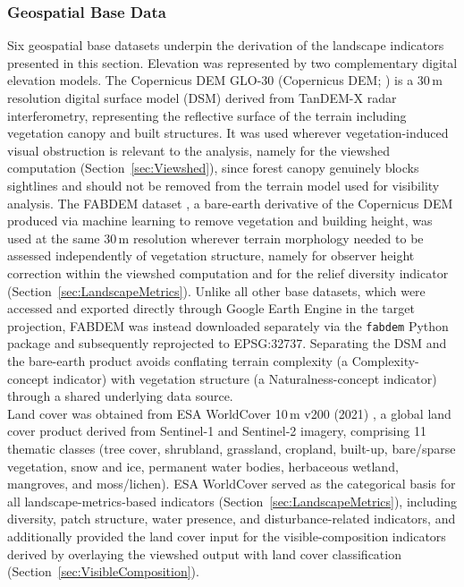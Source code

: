 \documentclass[hidelinks, 11pt]{article}
\begin{document}
\subsubsection{Geospatial Base Data}
Six geospatial base datasets underpin the derivation of the landscape indicators presented in this section. Elevation was represented by two complementary digital elevation models. The Copernicus DEM GLO-30 (Copernicus DEM; \citep{esa_copernicus_2024}) is a 30\,m resolution digital surface model (DSM) derived from TanDEM-X radar interferometry, representing the reflective surface of the terrain including vegetation canopy and built structures. It was used wherever vegetation-induced visual obstruction is relevant to the analysis, namely for the viewshed computation (Section~\ref{sec:Viewshed}), since forest canopy genuinely blocks sightlines and should not be removed from the terrain model used for visibility analysis. The FABDEM dataset \citep{hawker_fabdem_2022}, a bare-earth derivative of the Copernicus DEM produced via machine learning to remove vegetation and building height, was used at the same 30\,m resolution wherever terrain morphology needed to be assessed independently of vegetation structure, namely for observer height correction within the viewshed computation and for the relief diversity indicator (Section~\ref{sec:LandscapeMetrics}). Unlike all other base datasets, which were accessed and exported directly through Google Earth Engine \citep{gorelick_google_2017} in the target projection, FABDEM was instead downloaded separately via the \texttt{fabdem} Python package and subsequently reprojected to EPSG:32737. Separating the DSM and the bare-earth product avoids conflating terrain complexity (a Complexity-concept indicator) with vegetation structure (a Naturalness-concept indicator) through a shared underlying data source.
\\
Land cover was obtained from ESA WorldCover 10\,m v200 (2021) \citep{zanaga_esa_2022}, a global land cover product derived from Sentinel-1 and Sentinel-2 imagery, comprising 11 thematic classes (tree cover, shrubland, grassland, cropland, built-up, bare/sparse vegetation, snow and ice, permanent water bodies, herbaceous wetland, mangroves, and moss/lichen). ESA WorldCover served as the categorical basis for all landscape-metrics-based indicators (Section~\ref{sec:LandscapeMetrics}), including diversity, patch structure, water presence, and disturbance-related indicators, and additionally provided the land cover input for the visible-composition indicators derived by overlaying the viewshed output with land cover classification (Section~\ref{sec:VisibleComposition}).
\end{document}
